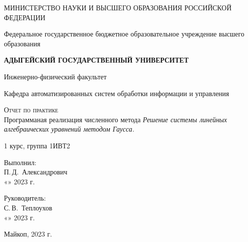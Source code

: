 \documentclass[12pt,a4paper]{scrartcl}
\begin{document}
\begin{titlepage}
		\begin{center}
			\large
			МИНИСТЕРСТВО НАУКИ И ВЫСШЕГО ОБРАЗОВАНИЯ РОССИЙСКОЙ ФЕДЕРАЦИИ
			
			Федеральное государственное бюджетное образовательное учреждение высшего образования
			
			\textbf{АДЫГЕЙСКИЙ ГОСУДАРСТВЕННЫЙ УНИВЕРСИТЕТ}
			\vspace{0.25cm}
			
			Инженерно-физический факультет
			
			Кафедра автоматизированных систем обработки информации и управления
			\vfill

			\vfill
			
			\textsc{Отчет по практике}\\[5mm]
			
			{\LARGE Программаная реализация численного метода \textit{Решение системы линейных алгебраических уравнений методом Гаусса.}}
			\bigskip
			
			1 курс, группа 1ИВТ2
		\end{center}
		\vfill
		
		\newlength{\ML}
		\hfill\begin{minipage}{0.5\textwidth}
			Выполнил:\\
			\underline{\hspace{\ML}} П.\,Д.~Александрович\\
			«\underline{\hspace{0.7cm}}» \underline{\hspace{2cm}} 2023 г.
		\end{minipage}%
		\bigskip
		
		\hfill\begin{minipage}{0.5\textwidth}
			Руководитель:\\
			\underline{\hspace{\ML}} С.\,В.~Теплоухов\\
			«\underline{\hspace{0.7cm}}» \underline{\hspace{2cm}} 2023 г.
		\end{minipage}%
		\vfill
		
		\begin{center}
			Майкоп, 2023 г.
		\end{center}
  \end{titlepage}
\end{document}

